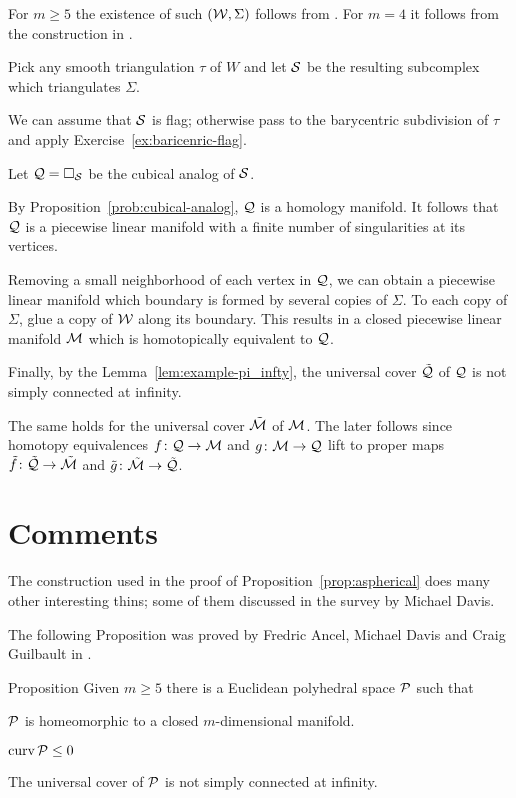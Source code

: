 For $m\ge 5$ the existence of such $(\mathcal{W}, \Sigma)$ follows from \cite{kervaire}. 
For $m=4$ it follows from the construction in \cite{mazur}.

Pick any smooth triangulation $\tau$ of $W$ and let $\mathcal{S}$ be the resulting subcomplex which triangulates $\Sigma$.


We can assume that $\mathcal{S}$ is flag; 
otherwise pass to the barycentric subdivision 
of $\tau$ and apply Exercise~\ref{ex:baricenric-flag}.


Let $\mathcal{Q}=\square_{\mathcal{S}}$ be the cubical analog of $\mathcal{S}$.

By Proposition~\ref{prob:cubical-analog},
$\mathcal{Q}$ is a homology manifold.
It follows that $\mathcal{Q}$ is a piecewise linear manifold 
with a finite number of singularities at its vertices.


Removing a small neighborhood of each vertex in $\mathcal{Q}$,
we can obtain a piecewise linear manifold 
which boundary is formed by several copies of $\Sigma$.
To each copy of $\Sigma$, 
glue a copy of  $\mathcal{W}$ along its boundary.
This results in a  closed piecewise linear manifold 
$\mathcal{M}$ which is homotopically equivalent to $\mathcal{Q}$.

Finally, by the Lemma~\ref{lem:example-pi_infty},  
the universal cover $\tilde{\mathcal{Q}}$ of $\mathcal{Q}$
is not simply connected at infinity.

The same holds for 
the universal cover $\tilde{\mathcal{M}}$ of $\mathcal{M}$.
The later follows since homotopy equivalences 
$f\: \spc Q\to \spc M$ and $g\:\spc M\to \spc Q$ 
lift to proper maps 
$\tilde f \: \tilde{\spc{Q}}\to \tilde{\spc{M}}$
and $\tilde g \: \tilde{\spc{M}}\to \tilde{\spc{Q}}$. 
\qeds


\section{Comments}

The construction used in the proof of  Proposition~\ref{prop:aspherical} does many other interesting thins; 
some of them discussed in the survey \cite{davis-survey} by Michael Davis.

The following Proposition was proved by Fredric Ancel, Michael Davis and Craig Guilbault in \cite{ADG}. 


\begin{thm}{Proposition}\label{prop:loc-CAT-mnfld}
Given $m\ge 5$ there is a Euclidean polyhedral space $\mathcal{P}$ such that
\begin{subthm}{}
$\mathcal{P}$ is homeomorphic to a closed $m$-dimensional manifold.
\end{subthm}

\begin{subthm}{}
$\curv\spc{P}\le 0$
\end{subthm}

\begin{subthm}{}
The universal cover of $\mathcal{P}$ is not simply connected at infinity.
\end{subthm}
\end{thm}

